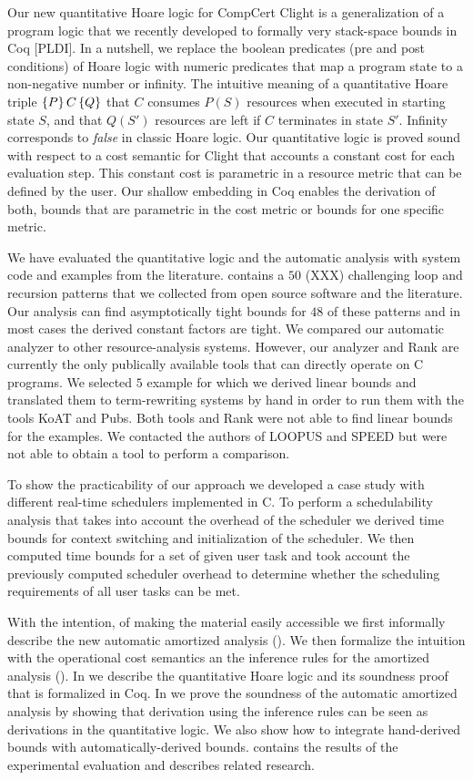 \documentclass[nocopyrightspace,preprint]{sigplanconf}
\newcommand{\pref}[1]{\prettyref{#1}}
\begin{document}
Our new quantitative Hoare logic for CompCert Clight is a
generalization of a program logic that we recently developed to
formally very stack-space bounds in Coq [PLDI].  In a nutshell, we
replace the boolean predicates (pre and post conditions) of Hoare
logic with numeric predicates that map a program state to a
non-negative number or infinity.  The intuitive meaning of a
quantitative Hoare triple $\{P\}\, C\, \{Q\}$ that $C$ consumes $P(S)$
resources when executed in starting state $S$, and that $Q(S')$
resources are left if $C$ terminates in state $S'$.  Infinity
corresponds to \emph{false} in classic Hoare logic.  Our quantitative
logic is proved sound with respect to a cost semantic for Clight that
accounts a constant cost for each evaluation step.  This constant cost
is parametric in a resource metric that can be defined by the user.
Our shallow embedding in Coq enables the derivation of both, bounds
that are parametric in the cost metric or bounds for one specific
metric.

We have evaluated the quantitative logic and the automatic analysis
with system code and examples from the literature. \pref{app:cat}
contains a $50$ (XXX) challenging loop and recursion patterns that we
collected from open source software and the literature.  Our analysis
can find asymptotically tight bounds for $48$ of these patterns and in
most cases the derived constant factors are tight.  We compared our
automatic analyzer to other resource-analysis systems.  However, our
analyzer and Rank are currently the only publically available tools
that can directly operate on C programs.  We selected $5$ example for
which we derived linear bounds and translated them to term-rewriting
systems by hand in order to run them with the tools KoAT and Pubs.
Both tools and Rank were not able to find linear bounds for the
examples.  We contacted the authors of LOOPUS and SPEED but were not
able to obtain a tool to perform a comparison.

To show the practicability of our approach we developed a case study
with different real-time schedulers implemented in C.  To perform a
schedulability analysis that takes into account the overhead of the
scheduler we derived time bounds for context switching and
initialization of the scheduler.  We then computed time bounds for a
set of given user task and took account the previously computed
scheduler overhead to determine whether the scheduling requirements of
all user tasks can be met.

With the intention, of making the material easily accessible we first
informally describe the new automatic amortized analysis
(\pref{sec:inform}).  We then formalize the intuition with the
operational cost semantics an the inference rules for the amortized
analysis (\pref{sec:aa}).  In \pref{sec:logic} we describe the
quantitative Hoare logic and its soundness proof that is formalized in
Coq.  In \pref{sec:inter} we prove the soundness of the automatic
amortized analysis by showing that derivation using the inference
rules can be seen as derivations in the quantitative logic.  We also
show how to integrate hand-derived bounds with automatically-derived
bounds.  \pref{sec:exper} contains the results of the experimental
evaluation and \pref{sec:related} describes related research.
\end{document}
